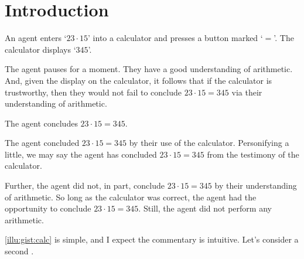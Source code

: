 \chapter{Introduction}
\label{cha:intro}

\begin{note}
  \begin{scenario}[Multiplication]
    \label{illu:gist:calc}
    An agent enters `\(23 \cdot 15\)' into a calculator and presses a button marked `\(=\)'.
    The calculator displays `\(345\)'.

    The agent pauses for a moment.
    They have a good understanding of arithmetic.
    And, given the display on the calculator, it follows that if the calculator is trustworthy, then they would not fail to conclude \(23 \cdot 15 = 345\) via their understanding of arithmetic.

    The agent concludes \(23 \cdot 15 = 345\).
  \end{scenario}

  The agent concluded \(23 \cdot 15 = 345\) by their use of the calculator.
  Personifying a little, we may say the agent has concluded \(23 \cdot 15 = 345\) from the testimony of the calculator.

  Further, the agent did not, in part, conclude \(23 \cdot 15 = 345\) by their understanding of arithmetic.
  So long as the calculator was correct, the agent had the opportunity to conclude \(23 \cdot 15 = 345\).
  Still, the agent did not perform any arithmetic.
\end{note}

\begin{note}
  \autoref{illu:gist:calc} is simple, and I expect the commentary is intuitive.
  Let's consider a second .
\end{note}

